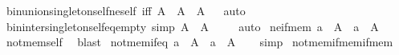 \begin{isabellebody}
\isamarkupfalse%
\ bin{\isacharunderscore}{\kern0pt}union{\isacharunderscore}{\kern0pt}singleton{\isacharunderscore}{\kern0pt}self{\isacharunderscore}{\kern0pt}ne{\isacharunderscore}{\kern0pt}self\ {\isacharbrackleft}{\kern0pt}iff{\isacharbrackright}{\kern0pt}{\isacharcolon}{\kern0pt}\ {\isachardoublequoteopen}A\ {\isasymunion}\ {\isacharbraceleft}{\kern0pt}A{\isacharbraceright}{\kern0pt}\ {\isasymnoteq}\ A{\isachardoublequoteclose}%
\isadelimproof
\ %
\endisadelimproof
%
\isatagproof
{}\isamarkupfalse%
\ auto%
\endisatagproof
{\isafoldproof}%
%
\isadelimproof
%
\endisadelimproof
\isanewline
\isanewline
{}\isamarkupfalse%
\ bin{\isacharunderscore}{\kern0pt}inter{\isacharunderscore}{\kern0pt}singleton{\isacharunderscore}{\kern0pt}self{\isacharunderscore}{\kern0pt}eq{\isacharunderscore}{\kern0pt}empty\ {\isacharbrackleft}{\kern0pt}simp{\isacharbrackright}{\kern0pt}{\isacharcolon}{\kern0pt}\ {\isachardoublequoteopen}A\ {\isasyminter}\ {\isacharbraceleft}{\kern0pt}A{\isacharbraceright}{\kern0pt}\ {\isacharequal}{\kern0pt}\ {\isacharbraceleft}{\kern0pt}{\isacharbraceright}{\kern0pt}{\isachardoublequoteclose}%
\isadelimproof
\ %
\endisadelimproof
%
\isatagproof
{}\isamarkupfalse%
\ auto%
\endisatagproof
{\isafoldproof}%
%
\isadelimproof
%
\endisadelimproof
\isanewline
\isanewline
{}\isamarkupfalse%
\ ne{\isacharunderscore}{\kern0pt}if{\isacharunderscore}{\kern0pt}mem{\isacharcolon}{\kern0pt}\ {\isachardoublequoteopen}a\ {\isasymin}\ A\ {\isasymLongrightarrow}\ a\ {\isasymnoteq}\ A{\isachardoublequoteclose}\isanewline
%
\isadelimproof
\ \ %
\endisadelimproof
%
\isatagproof
{}\isamarkupfalse%
\ not{\isacharunderscore}{\kern0pt}mem{\isacharunderscore}{\kern0pt}self\ \isamarkupfalse%
\ blast%
\endisatagproof
{\isafoldproof}%
%
\isadelimproof
\isanewline
%
\endisadelimproof
\isanewline
{}\isamarkupfalse%
\ not{\isacharunderscore}{\kern0pt}mem{\isacharunderscore}{\kern0pt}if{\isacharunderscore}{\kern0pt}eq{\isacharcolon}{\kern0pt}\ {\isachardoublequoteopen}a\ {\isacharequal}{\kern0pt}\ A\ {\isasymLongrightarrow}\ a\ {\isasymnotin}\ A{\isachardoublequoteclose}\isanewline
%
\isadelimproof
\ \ %
\endisadelimproof
%
\isatagproof
{}\isamarkupfalse%
\ simp%
\endisatagproof
{\isafoldproof}%
%
\isadelimproof
\isanewline
%
\endisadelimproof
\isanewline
{}\isamarkupfalse%
\ not{\isacharunderscore}{\kern0pt}mem{\isacharunderscore}{\kern0pt}if{\isacharunderscore}{\kern0pt}mem{\isacharunderscore}{\kern0pt}if{\isacharunderscore}{\kern0pt}mem{\isacharcolon}{\kern0pt}\isanewline

\end{isabellebody}
